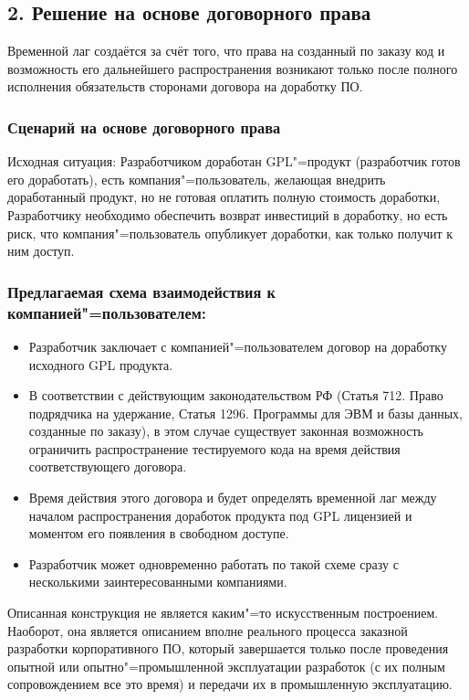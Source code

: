 \documentclass[10pt, a5paper]{article}
\begin{document}
\subsection*{2. Решение на основе договорного права}

Временной лаг создаётся за счёт того, что права на созданный по заказу код и возможность его дальнейшего распространения возникают только после полного исполнения обязательств сторонами договора на доработку ПО.

\subsubsection*{Сценарий на основе договорного права}

Исходная ситуация: Разработчиком доработан GPL"=продукт \linebreak  (разработчик готов его доработать), есть компания"=пользователь, желающая внедрить доработанный продукт, но не готовая оплатить полную стоимость доработки, Разработчику необходимо обеспечить возврат инвестиций в доработку, но есть риск, что компания"=пользователь опубликует доработки, как только получит к ним доступ.

\subsubsection*{Предлагаемая схема взаимодействия к компанией"=пользователем:}

\begin{itemize}
  \item Разработчик заключает с компанией"=пользователем договор на доработку исходного GPL продукта.
  \item В соответствии с действующим законодательством РФ (Статья 712. Право подрядчика на удержание, Статья 1296. Программы для ЭВМ и базы данных, созданные по заказу), в этом случае существует законная возможность ограничить распространение тестируемого кода на время действия соответствующего договора.
  \item Время действия этого договора и будет определять временной лаг между началом распространения доработок продукта под GPL лицензией и моментом его появления в свободном доступе.
  \item Разработчик может одновременно работать по такой схеме сразу с несколькими заинтересованными компаниями.
\end{itemize}

Описанная конструкция не является каким"=то искусственным построением. Наоборот, она является описанием вполне реального процесса заказной разработки корпоративного ПО, который завершается только после проведения опытной или опытно"=промышленной эксплуатации разработок (с их полным сопровождением все это время) и передачи их в промышленную эксплуатацию.
\end{document}
